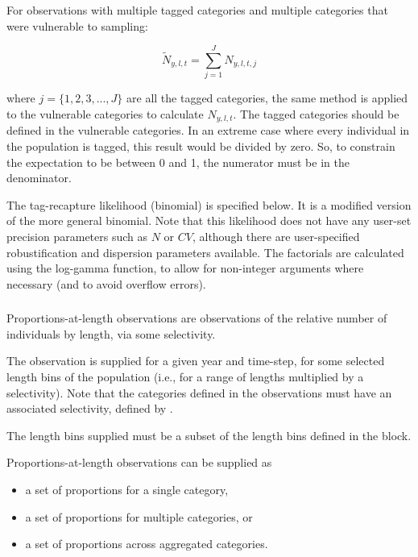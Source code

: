 For observations with multiple tagged categories and multiple categories that were vulnerable to sampling:

\begin{equation}
	\tilde{N}_{y,l,t} = \sum_{j = 1}^{J} N_{y,l,t,j}
\end{equation}

where $j = \{1,2,3,...,J\}$  are all the tagged categories, the same method is applied to the vulnerable categories to calculate $N_{y,l,t}$. The tagged categories should be defined in the vulnerable categories. In an extreme case where every individual in the population is tagged, this result would be divided by zero. So, to constrain the expectation to be between 0 and 1, the numerator must be in the denominator.

The tag-recapture likelihood (binomial) is specified below. It is a modified version of the more general binomial. Note that this likelihood does not have any user-set precision parameters such as $N$ or $CV$, although there are user-specified robustification and dispersion parameters available. The factorials are calculated using the log-gamma function, to allow for non-integer arguments where necessary (and to avoid overflow errors).
\else

\subsubsection{} \label{sec:Observation-ProportionsAtLength}

Proportions-at-length observations are observations of the relative number of individuals by length, via some selectivity.

The observation is supplied for a given year and time-step, for some selected length bins of the population (i.e., for a range of lengths multiplied by a selectivity). Note that the categories defined in the observations must have an associated selectivity, defined by .

The length bins supplied must be a subset of the length bins defined in the  block. 

Proportions-at-length observations can be supplied as

\begin{itemize}
	\item a set of proportions for a single category,
	\item a set of proportions for multiple categories, or
	\item a set of proportions across aggregated categories.
\end{itemize}

